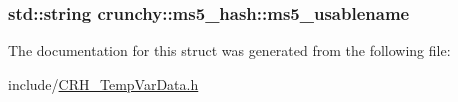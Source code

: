 \subsubsection[{ms5\+\_\+usablename}]{\setlength{\rightskip}{0pt plus 5cm}std\+::string crunchy\+::ms5\+\_\+hash\+::ms5\+\_\+usablename}\hypertarget{structcrunchy_1_1ms5__hash_a375a1251bbe67bb9928f1b4154154ef0}{}\label{structcrunchy_1_1ms5__hash_a375a1251bbe67bb9928f1b4154154ef0}


The documentation for this struct was generated from the following file\+:\begin{DoxyCompactItemize}
\item 
include/\hyperlink{_c_r_h___temp_var_data_8h}{C\+R\+H\+\_\+\+Temp\+Var\+Data.\+h}\end{DoxyCompactItemize}

